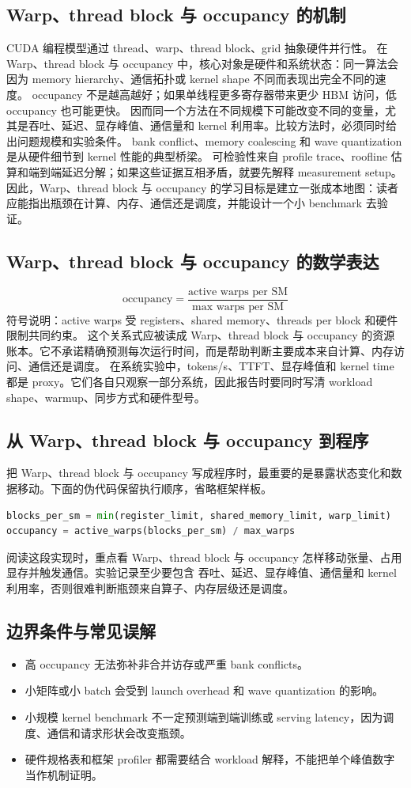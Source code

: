 \documentclass[a4paper]{article}
\begin{document}
\subsection{Warp、thread block 与 occupancy 的机制}
CUDA 编程模型通过 thread、warp、thread block、grid 抽象硬件并行性。 在 Warp、thread block 与 occupancy 中，核心对象是硬件和系统状态：同一算法会因为 memory hierarchy、通信拓扑或 kernel shape 不同而表现出完全不同的速度。
occupancy 不是越高越好；如果单线程更多寄存器带来更少 HBM 访问，低 occupancy 也可能更快。 因而同一个方法在不同规模下可能改变不同的变量，尤其是吞吐、延迟、显存峰值、通信量和 kernel 利用率。比较方法时，必须同时给出问题规模和实验条件。
bank conflict、memory coalescing 和 wave quantization 是从硬件细节到 kernel 性能的典型桥梁。 可检验性来自 profile trace、roofline 估算和端到端延迟分解；如果这些证据互相矛盾，就要先解释 measurement setup。
因此，Warp、thread block 与 occupancy 的学习目标是建立一张成本地图：读者应能指出瓶颈在计算、内存、通信还是调度，并能设计一个小 benchmark 去验证。
\subsection{Warp、thread block 与 occupancy 的数学表达}
\[\text{occupancy}=\frac{\text{active warps per SM}}{\text{max warps per SM}}\]
符号说明：active warps 受 registers、shared memory、threads per block 和硬件限制共同约束。
这个关系式应被读成 Warp、thread block 与 occupancy 的资源账本。它不承诺精确预测每次运行时间，而是帮助判断主要成本来自计算、内存访问、通信还是调度。
在系统实验中，tokens/s、TTFT、显存峰值和 kernel time 都是 proxy。它们各自只观察一部分系统，因此报告时要同时写清 workload shape、warmup、同步方式和硬件型号。
\subsection{从 Warp、thread block 与 occupancy 到程序}
把 Warp、thread block 与 occupancy 写成程序时，最重要的是暴露状态变化和数据移动。下面的伪代码保留执行顺序，省略框架样板。
\begin{lstlisting}[language=Python]
blocks_per_sm = min(register_limit, shared_memory_limit, warp_limit)
occupancy = active_warps(blocks_per_sm) / max_warps
\end{lstlisting}
阅读这段实现时，重点看 Warp、thread block 与 occupancy 怎样移动张量、占用显存并触发通信。实验记录至少要包含 吞吐、延迟、显存峰值、通信量和 kernel 利用率，否则很难判断瓶颈来自算子、内存层级还是调度。
\subsection{边界条件与常见误解}
\begin{itemize}
\item 高 occupancy 无法弥补非合并访存或严重 bank conflicts。
\item 小矩阵或小 batch 会受到 launch overhead 和 wave quantization 的影响。
\item 小规模 kernel benchmark 不一定预测端到端训练或 serving latency，因为调度、通信和请求形状会改变瓶颈。
\item 硬件规格表和框架 profiler 都需要结合 workload 解释，不能把单个峰值数字当作机制证明。
\end{itemize}
\end{document}
